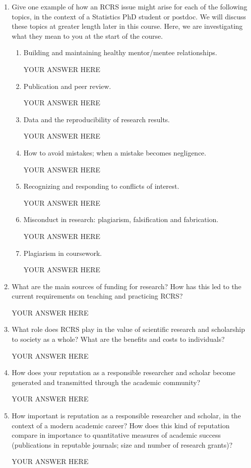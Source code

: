 \documentclass[12pt]{article}
\begin{document}
\begin{enumerate}
\item Give one example of how an RCRS issue might arise for each of the following topics, in the context of a Statistics PhD student or postdoc. We will discuss these topics at greater length later in this course. Here, we are investigating what they mean to you at the start of the course.
\begin{enumerate}
\item Building and maintaining healthy mentor/mentee relationships.

YOUR ANSWER HERE

\item Publication and peer review. 

YOUR ANSWER HERE

\item Data and the reproducibility of research results.

YOUR ANSWER HERE

\item How to avoid mistakes; when a mistake becomes negligence.

YOUR ANSWER HERE

\item Recognizing and responding to conflicts of interest.

YOUR ANSWER HERE

\item Misconduct in research: plagiarism, falsification and fabrication.

YOUR ANSWER HERE

\item Plagiarism in coursework.

YOUR ANSWER HERE

\end{enumerate}

\item What are the main sources of funding for research? How has this led to the current requirements on teaching and practicing RCRS?

YOUR ANSWER HERE

\item What role does RCRS play in the value of scientific research and scholarship to society as a whole? What are the benefits and costs to individuals?


YOUR ANSWER HERE

\item How does your reputation as a responsible researcher and scholar become generated and transmitted through the academic community?

YOUR ANSWER HERE

\item How important is reputation as a responsible researcher and scholar, in the context of a modern academic career? How does this kind of reputation compare in importance to quantitative measures of academic success (publications in reputable journals; size and number of research grants)? 

YOUR ANSWER HERE

\end{enumerate}
\end{document}
